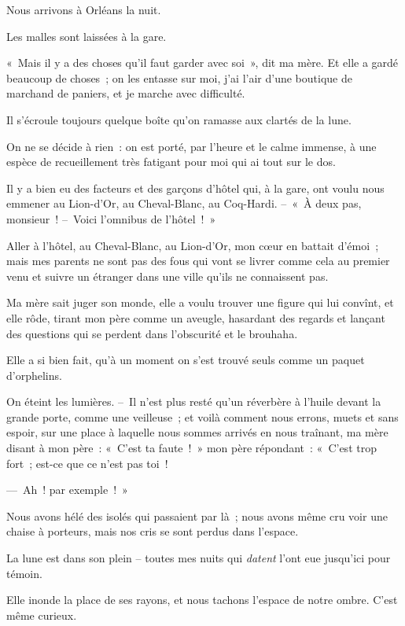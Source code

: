 \documentclass[french,twoside]{book} %
\def\mednobreak{\ifdim\lastskip<\medskipamount
  \removelastskip\nopagebreak\medskip\fi}
\newcommand{\labelblock}[1]{\medbreak{\noindent\color{rubric}\bfseries #1}\par\mednobreak}
\begin{document}
\labelblock{ORLÉANS}

\noindent Nous arrivons à Orléans la nuit.\par
Les malles sont laissées à la gare.\par
« Mais il y a des choses qu’il faut garder avec soi », dit ma mère. Et elle a gardé beaucoup de choses ; on les entasse sur moi, j’ai l’air d’une boutique de marchand de paniers, et je marche avec difficulté.\par
Il s’écroule toujours quelque boîte qu’on ramasse aux clartés de la lune.\par
On ne se décide à rien : on est porté, par l’heure et le calme immense, à une espèce de recueillement très fatigant pour moi qui ai tout sur le dos.\par
Il y a bien eu des facteurs et des garçons d’hôtel qui, à la gare, ont voulu nous emmener au Lion-d’Or, au Cheval-Blanc, au Coq-Hardi. – « À deux pas, monsieur ! – Voici l’omnibus de l’hôtel ! »\par
Aller à l’hôtel, au Cheval-Blanc, au Lion-d’Or, mon cœur en battait d’émoi ; mais mes parents ne sont pas des fous qui vont se livrer comme cela au premier venu et suivre un étranger dans une ville qu’ils ne connaissent pas.\par
Ma mère sait juger son monde, elle a voulu trouver une figure qui lui convînt, et elle rôde, tirant mon père comme un aveugle, hasardant des regards et lançant des questions qui se perdent dans l’obscurité et le brouhaha.\par
Elle a si bien fait, qu’à un moment on s’est trouvé seuls comme un paquet d’orphelins.\par
\bigbreak
\noindent On éteint les lumières. – Il n’est plus resté qu’un réverbère à l’huile devant la grande porte, comme une veilleuse ; et voilà comment nous errons, muets et sans espoir, sur une place à laquelle nous sommes arrivés en nous traînant, ma mère disant à mon père : « C’est ta faute ! » mon père répondant : « C’est trop fort ; est-ce que ce n’est pas toi !\par
— Ah ! par exemple ! »\par
Nous avons hélé des isolés qui passaient par là ; nous avons même cru voir une chaise à porteurs, mais nos cris se sont perdus dans l’espace.\par
La lune est dans son plein – toutes mes nuits qui \emph{datent} l’ont eue jusqu’ici pour témoin.\par
Elle inonde la place de ses rayons, et nous tachons l’espace de notre ombre. C’est même curieux.\par
\end{document}
